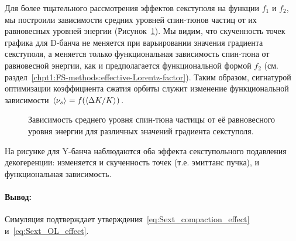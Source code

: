 Для более тщательного рассмотрения эффектов секступоля на функции $f_1$ и $f_2$, мы построили зависимости средних уровней спин-тюнов частиц от их равновесных уровней энергии (Рисунок~\ref{fig:ST_vs_dkok_for_sext_strenghts}). Мы видим, что скученность точек графика для D-банча не меняется при варьировании значения градиента секступоля, а меняется только функциональная зависимость спин-тюна от равновесной энергии, как и предполагается функциональной формой $f_2$ (см. раздел~\ref{chpt1:FS-methods:effective-Lorentz-factor}). Таким образом, сигнатурой оптимизации коэффициента сжатия орбиты служит изменение функциональной зависимости $\avg{\nu_s} = f(\avg{\Delta K/K})$.

\begin{figure}[H]
	\centering
\end{figure}
\begin{figure}[H]\centering
	\caption{Зависимость среднего уровня спин-тюна частицы от её равновесного уровня энергии для различных значений градиента секступоля.\label{fig:ST_vs_dkok_for_sext_strenghts}}
\end{figure}

На рисунке для Y-банча наблюдаются оба эффекта секступольного подавления декогеренции: изменяется и скученность точек (т.е. эмиттанс пучка), и функциональная зависимость.

\paragraph{Вывод:} Симуляция подтверждает утверждения~\eqref{eq:Sext_compaction_effect} и~\eqref{eq:Sext_OL_effect}.